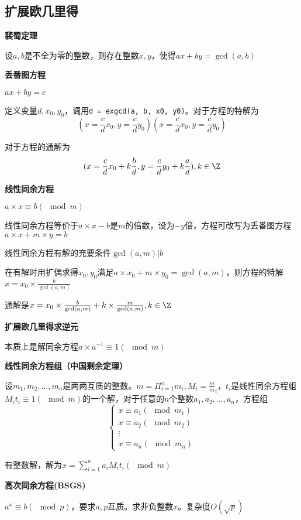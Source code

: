 \subsection{扩展欧几里得}
\textbf{裴蜀定理}

设$a,b$是不全为零的整数，则存在整数$x,y$，使得$ax+by=\gcd(a,b)$


\textbf{丢番图方程}

$ax+by=c$

定义变量$d,x_0,y_0$，调用\verb|d = exgcd(a, b, x0, y0)|。对于方程的特解为
\[
(x=\frac c d x_0 , y = \frac c d y_0)(x=\frac c d x_0 , y = \frac c d y_0)
\]

对于方程的通解为
\[
(x = \frac c d x_0 + k \frac b d , y = \frac c d y_0 + k \frac a d ) ,k \in \Z
\]

\textbf{线性同余方程}

$a\times x\equiv b(\mod m)$

线性同余方程等价于$a\times x - b$是$m$的倍数，设为$-y$倍，方程可改写为丢番图方程$a \times x + m\times y=b$

线性同余方程有解的充要条件$\gcd(a,m)|b$

在有解时用扩偶求得$x_0,y_0$满足$a\times x_0+m\times y_0=\gcd(a,m)$，则方程的特解$x=x_0\times \frac b{\gcd(a,m)}$

通解是$x=x_0\times \frac b{\gcd(a,m)} + k\times \frac{m}{\gcd(a,m)},k\in \Z$



\textbf{扩展欧几里得求逆元}

本质上是解同余方程$a\times a^{-1} \equiv 1 (\mod m)$



\textbf{线性同余方程组（中国剩余定理）}

设$m_1,m_2,\dots,m_n$是两两互质的整数。$m=\Pi_{i=1}^nm_i,M_i=\frac m m_i$，$t_i$是线性同余方程组$M_it_i\equiv 1(\mod m)$的一个解，对于任意的$n$个整数$a_1,a_2,\dots,a_n$，方程组
\[
\left\{\begin{matrix}
           x\equiv a_1(\mod m_1)\\
           x\equiv a_2(\mod m_2)\\
           \vdots \\
           x\equiv a_n(\mod m_n)
\end{matrix}\right.
\]


有整数解，解为$x=\sum_{i=1}^na_iM_it_i(\mod m)$



\textbf{高次同余方程(BSGS)}

$a^x\equiv b (\mod p)$，要求$a,p$互质。求非负整数$x$。复杂度$O(\sqrt p)$

